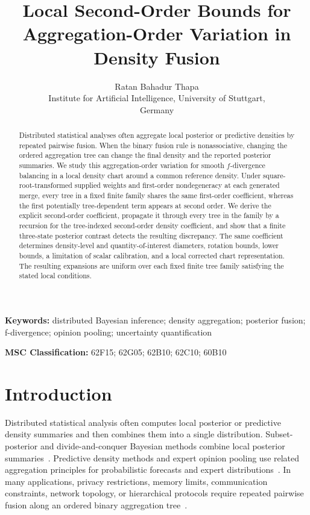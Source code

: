 \documentclass[11pt]{article}
\theoremstyle{plain}
\theoremstyle{definition}
\theoremstyle{definition}
\begin{document}
\title{Local Second-Order Bounds for Aggregation-Order Variation in Density Fusion}

\author{Ratan Bahadur Thapa \\
Institute for Artificial Intelligence, University of Stuttgart,\\
Germany}
\date{}

\maketitle

\begin{abstract}
Distributed statistical analyses often aggregate local posterior or predictive densities by repeated pairwise fusion. When the binary fusion rule is nonassociative, changing the ordered aggregation tree can change the final density and the reported posterior summaries. We study this aggregation-order variation for smooth $f$-divergence balancing in a local density chart around a common reference density. Under square-root-transformed supplied weights and first-order nondegeneracy at each generated merge, every tree in a fixed finite family shares the same first-order coefficient, whereas the first potentially tree-dependent term appears at second order. We derive the explicit second-order coefficient, propagate it through every tree in the family by a recursion for the tree-indexed second-order density coefficient, and show that a finite three-state posterior contrast detects the resulting discrepancy. The same coefficient determines density-level and quantity-of-interest diameters, rotation bounds, lower bounds, a limitation of scalar calibration, and a local corrected chart representation. The resulting expansions are uniform over each fixed finite tree family satisfying the stated local conditions.
\end{abstract}

\noindent\textbf{Keywords:} distributed Bayesian inference; density aggregation; posterior fusion; f-divergence; opinion pooling; uncertainty quantification

\medskip
\noindent\textbf{MSC Classification:} 62F15; 62G05; 62B10; 62C10; 60B10

\section{Introduction}\label{sec:intro}
Distributed statistical analysis often computes local posterior or predictive density summaries and then combines them into a single distribution. Subset-posterior and divide-and-conquer Bayesian methods combine local posterior summaries~\cite{neiswanger2014asymptotically,scott2016bayes,srivastava2018scalable}. Predictive density methods and expert opinion pooling use related aggregation principles for probabilistic forecasts and expert distributions~\cite{stone1961opinion,genest1986combining,jacobs1995methods,gneiting2007strictly}. In many applications, privacy restrictions, memory limits, communication constraints, network topology, or hierarchical protocols require repeated pairwise fusion along an ordered binary aggregation tree~\cite{agarwal2013mergeable}.
\end{document}
